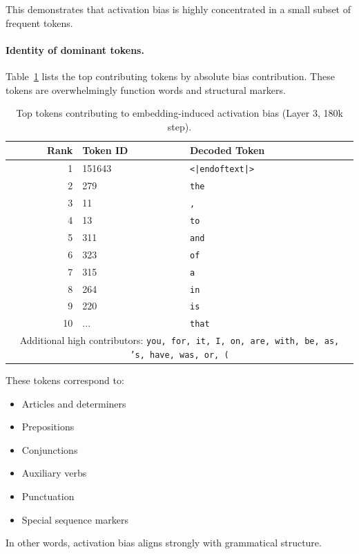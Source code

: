 This demonstrates that activation bias is highly concentrated
in a small subset of frequent tokens.

\paragraph{Identity of dominant tokens.}

Table~\ref{tab:top_tokens_bias} lists the top contributing tokens
by absolute bias contribution.
These tokens are overwhelmingly function words and structural markers.

\begin{table}[t]
\centering
\caption{Top tokens contributing to embedding-induced activation bias (Layer 3, 180k step).}
\label{tab:top_tokens_bias}
\begin{tabular}{rll}
\toprule
Rank & Token ID & Decoded Token \\
\midrule
1  & 151643 & \texttt{<|endoftext|>} \\
2  & 279    & \texttt{the} \\
3  & 11     & \texttt{,} \\
4  & 13     & \texttt{to} \\
5  & 311    & \texttt{and} \\
6  & 323    & \texttt{of} \\
7  & 315    & \texttt{a} \\
8  & 264    & \texttt{in} \\
9  & 220    & \texttt{is} \\
10 & ...    & \texttt{that} \\
\midrule
\multicolumn{3}{c}{Additional high contributors: \texttt{you, for, it, I, on, are, with, be, as, 's, have, was, or, (}} \\
\bottomrule
\end{tabular}
\end{table}

These tokens correspond to:

\begin{itemize}
\item Articles and determiners
\item Prepositions
\item Conjunctions
\item Auxiliary verbs
\item Punctuation
\item Special sequence markers
\end{itemize}

In other words, activation bias aligns strongly with grammatical structure.

